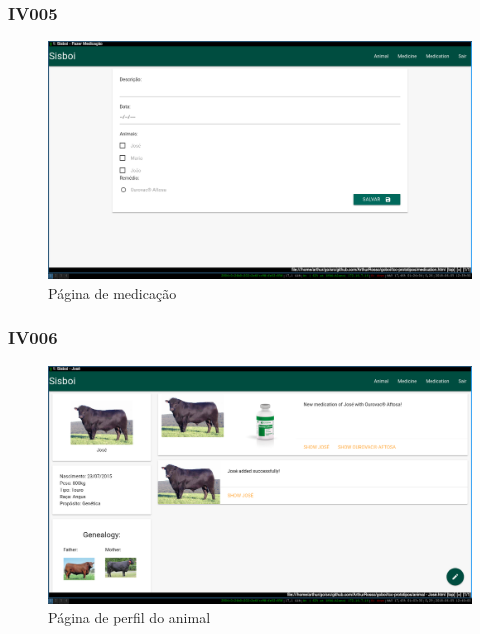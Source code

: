 \documentclass[12pt]{article}
\begin{document}
\begin{titlepage}
\begin{figure}[!h]
\begin{center}
		\end{center}
	\end{figure}

	\newpage

	\subsubsection{IV005}

	\begin{figure}[!h]
		\begin{center}
			\caption{Página de medicação}
			\includegraphics[width=13cm]{img/prototipos/medicacao.png}


		\end{center}
	\end{figure}


	\subsubsection{IV006}

	\begin{figure}[!h]
		\begin{center}
			\caption{Página de perfil do animal}
			\includegraphics[width=13cm]{img/prototipos/perfil.png}


\end{center}
\end{figure}
\end{titlepage}
\end{document}
